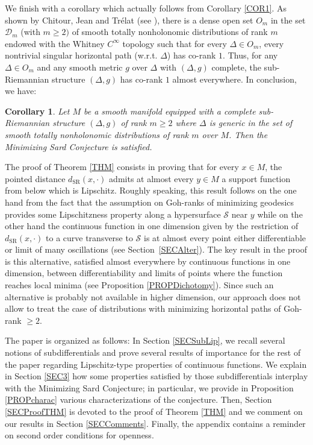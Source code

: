 \documentclass[JEP,XML,SOM,Unicode,NoFloatCountersInSection,published]{cedram}
\newcommand{\SR}{{\scriptscriptstyle\mathrm{SR}}}
\newtheorem{corollary}[theorem]{Corollary}
\theoremstyle{definition}
\begin{document}
We finish with a corollary which actually follows from Corollary \ref{COR1}. As shown by Chitour, Jean and Trélat (see \cite[Th.\,2.4]{cjt06}), there is a dense open set $O_m$ in the set $\mathcal{D}_m$ (with $m\geq 2)$ of smooth totally nonholonomic distributions of rank $m$ endowed with the Whitney $C^{\infty}$ topology such that for every $\Delta \in O_m$, every nontrivial singular horizontal path (w.r.t. $\Delta$) has co-rank $1$. Thus, for any $\Delta \in O_m$ and any smooth metric $g$ over $\Delta$ with $(\Delta,g)$ complete, the sub-Riemannian structure $(\Delta,g)$ has co-rank $1$ almost everywhere. In conclusion, we have:

\begin{corollary}\label{COR3}
Let $M$ be a smooth manifold equipped with a complete sub-Riemannian structure $(\Delta,g)$ of rank $m\geq 2$ where $\Delta$ is generic in the set of smooth totally nonholonomic distributions of rank $m$ over $M$. Then the Minimizing Sard Conjecture is satisfied.
\end{corollary}

The proof of Theorem \ref{THM} consists in proving that for every $x\in M$, the pointed distance $d_{\SR}(x,\cdot)$ admits at almost every $y\in M$ a support function from below which is Lipschitz. Roughly speaking, this result follows on the one hand from the fact that the assumption on Goh-ranks of minimizing geodesics provides some Lipschitzness property along a hypersurface $\mathcal{S}$ near $y$ while on the other hand the continuous function in one dimension given by the restriction of $d_{\SR}(x,\cdot)$ to a curve transverse to $\mathcal{S}$ is at almost every point either differentiable or limit of many oscillations (see Section~\ref{SECAlter}). The key result in the proof is this alternative, satisfied almost everywhere by continuous functions in one dimension, between differentiability and limits of points where the function reaches local minima (see Proposition \ref{PROPDichotomy}). Since such an alternative is probably not available in higher dimension, our approach does not allow to treat the case of distributions with minimizing horizontal paths of Goh-rank $\geq 2$.

The paper is organized as follows: In Section \ref{SECSubLip}, we recall several notions of subdifferentials and prove several results of importance for the rest of the paper regarding Lipschitz-type properties of continuous functions. We explain in Section \ref{SEC3} how some properties satisfied by those subdifferentials interplay with the Minimizing Sard Conjecture; in particular, we provide in Proposition \ref{PROPcharac} various characterizations of the conjecture. Then, Section \ref{SECProofTHM} is devoted to the proof of Theorem \ref{THM} and we comment on our results in Section \ref{SECComments}. Finally, the appendix contains a reminder on second order conditions for openness.
\end{document}
